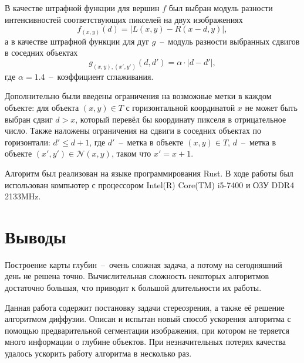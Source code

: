 \documentclass{ConfFTI}
\begin{document}
В качестве штрафной функции для вершин $f$ был выбран
модуль разности интенсивностей соответствующих пикселей на двух изображениях
\begin{equation*}
    f_{\left(x, y \right)} \left(d \right) =
    \left| L \left(x, y \right) - R \left( x - d, y \right) \right|,
\end{equation*}
а в качестве штрафной функции для дуг
$g$~--~модуль разности выбранных сдвигов в соседних объектах
\begin{equation*}
    g_{\left(x, y \right), \left(x', y' \right)} \left(d, d' \right) =
    \alpha \cdot \left| d - d' \right|,
\end{equation*}
где $\alpha = 1.4$~--~коэффициент сглаживания.

Дополнительно были введены ограничения на возможные метки в каждом объекте:
для объекта $\left(x, y \right) \in T$ с горизонтальной координатой $x$
не может быть выбран сдвиг $d > x$,
который перевёл бы координату пикселя в отрицательное число.
Также наложены ограничения на сдвиги в соседних объектах по горизонтали:
$d' \le d + 1$, где $d'$~--~метка в объекте $\left(x, y \right) \in T$,
$d$~--~метка в объекте $\left(x', y'\right) \in \mathcal{N}\left(x, y \right)$,
таком что $x' = x + 1$.

Алгоритм был реализован на языке программирования Rust.
В ходе работы был использован компьютер с процессором Intel(R) Core(TM) i5-7400
и ОЗУ DDR4 2133MHz.

\section*{Выводы}
Построение карты глубин~--~очень сложная задача,
а потому на сегодняшний день не решена точно.
Вычислительная сложность некоторых алгоритмов достаточно большая,
что приводит к большой длительности их работы.

Данная работа содержит постановку задачи стереозрения,
а также её решение алгоритмом диффузии.
Описан и испытан новый способ ускорения алгоритма с помощью
предварительной сегментации изображения,
при котором не теряется много информации о глубине объектов.
При незначительных потерях качества удалось ускорить работу алгоритма
в несколько раз.



\end{document}
